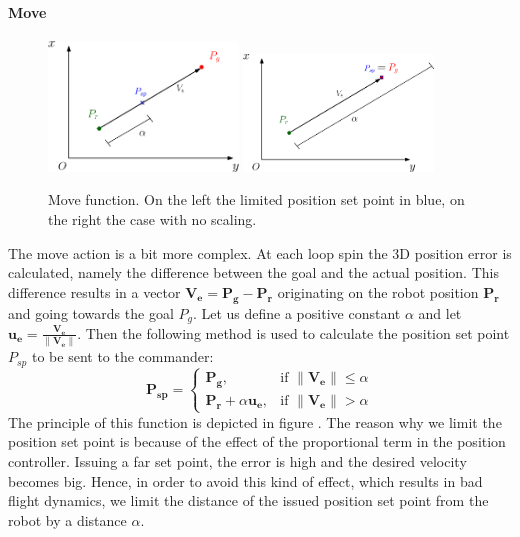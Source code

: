 \paragraph{Move} 

\begin{figure}[h]
\centering
 \includegraphics[width=0.45\textwidth]{move1.eps}\hspace{0.05\textwidth}
 \includegraphics[width=0.45\textwidth]{move2.eps}\\[2em]
 \caption[Move function.]{Move function. On the left the limited position set point in blue, on the right the case with no scaling.}
  \label{figure:move}
\end{figure}

The move action is a bit more complex. At each loop spin the 3D position error is calculated, namely the difference between the goal and the actual position.  This difference results in a vector $\boldsymbol{V_e} = \boldsymbol{P_g} - \boldsymbol{P_r}$ originating on the robot position $\boldsymbol{P_r}$ and going towards the goal $P_g$. Let us define a positive constant $\alpha$ and let $\boldsymbol{u_e} = 	\frac{\boldsymbol{V_e}}{\lVert\boldsymbol{V_e}\rVert}$. Then the following method is used to calculate the position set point $P_{sp}$ to be sent to the commander: 
\begin{equation}
\boldsymbol{P_{sp}} = 
\begin{cases}
    \boldsymbol{P_g}, & \text{if } \lVert\boldsymbol{V_e} \rVert \leq \alpha \\
    \boldsymbol{P_r} + \alpha \boldsymbol{u_e},&    \text{if } \lVert\boldsymbol{V_e}\rVert > \alpha
\end{cases}
\label{eq:move}
\end{equation}
The principle of this function is depicted in figure . The reason why we limit the position set point is because of the effect of the proportional term in the position controller. Issuing a far set point, the error is high and the desired velocity becomes big. Hence, in order to avoid this kind of effect, which results in bad flight dynamics, we limit the distance of the issued position set point from the robot by a distance $\alpha$.

